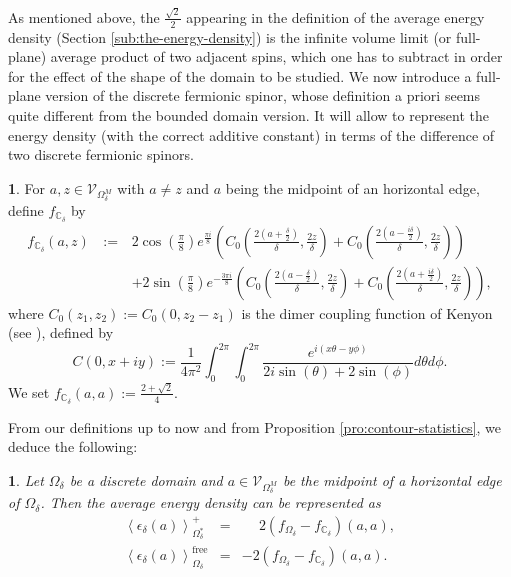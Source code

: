 \documentclass[oneside,english]{amsart}
\numberwithin{equation}{section}
\numberwithin{figure}{section}
\theoremstyle{plain}
\theoremstyle{plain}
\theoremstyle{plain}
\theoremstyle{plain}
\theoremstyle{plain}
\newtheorem{lem}[thm]{\protect\lemmaname}
\theoremstyle{definition}
\newtheorem{defn}[thm]{\protect\definitionname}
\theoremstyle{remark}
\providecommand{\definitionname}{Definition}
\providecommand{\lemmaname}{Lemma}
\begin{document}
As mentioned above, the $\frac{\sqrt{2}}{2}$ appearing in the definition
of the average energy density (Section \ref{sub:the-energy-density})
is the infinite volume limit (or full-plane) average product of two
adjacent spins, which one has to subtract in order for the effect
of the shape of the domain to be studied. We now introduce a full-plane
version of the discrete fermionic spinor, whose definition a priori
seems quite different from the bounded domain version. It will allow
to represent the energy density (with the correct additive constant)
in terms of the difference of two discrete fermionic spinors.
\begin{defn}
\label{def:full-plane-spinor}For $a,z\in\mathcal{V}_{\Omega_{\delta}^{M}}$
with $a\neq z$ and $a$ being the midpoint of an horizontal edge,
define $f_{\mathbb{C}_{\delta}}$ by
\begin{eqnarray*}
f_{\mathbb{C}_{\delta}}\left(a,z\right) & \,:=\, & 2\cos\left(\frac{\pi}{8}\right)e^{\frac{\pi i}{8}}\left(C_{0}\left(\frac{2\left(a+\frac{\delta}{2}\right)}{\delta},\frac{2z}{\delta}\right)+C_{0}\left(\frac{2\left(a-\frac{i\delta}{2}\right)}{\delta},\frac{2z}{\delta}\right)\right)\\
 &  & +2\sin\left(\frac{\pi}{8}\right)e^{-\frac{3\pi i}{8}}\left(C_{0}\left(\frac{2\left(a-\frac{\delta}{2}\right)}{\delta},\frac{2z}{\delta}\right)+C_{0}\left(\frac{2\left(a+\frac{i\delta}{2}\right)}{\delta},\frac{2z}{\delta}\right)\right),
\end{eqnarray*}
where $C_{0}\left(z_{1},z_{2}\right):=C_{0}\left(0,z_{2}-z_{1}\right)$
is the dimer coupling function of Kenyon (see \cite{kenyon-i}), defined
by
\[
C\left(0,x+iy\right):=\frac{1}{4\pi^{2}}\int_{0}^{2\pi}\int_{0}^{2\pi}\frac{e^{i\left(x\theta-y\phi\right)}}{2i\sin\left(\theta\right)+2\sin\left(\phi\right)}d\theta d\phi.
\]
We set $f_{\mathbb{C}_{\delta}}\left(a,a\right):=\frac{2+\sqrt{2}}{4}$. 
\end{defn}
From our definitions up to now and from Proposition \ref{pro:contour-statistics},
we deduce the following:
\begin{lem}
\label{lem:representation-ed-observable}Let $\Omega_{\delta}$ be
a discrete domain and $a\in\mathcal{V}_{\Omega_{\delta}^{M}}$ be
the midpoint of a horizontal edge of $\Omega_{\delta}$. Then the
average energy density can be represented as 
\begin{eqnarray*}
\left\langle \epsilon_{\delta}\left(a\right)\right\rangle _{\Omega_{\delta}^{*}}^{+} & = & \phantom{-}2\left(f_{\Omega_{\delta}}-f_{\mathbb{C}_{\delta}}\right)\left(a,a\right),\\
\left\langle \epsilon_{\delta}\left(a\right)\right\rangle _{\Omega_{\delta}}^{\mathrm{free}} & = & -2\left(f_{\Omega_{\delta}}-f_{\mathbb{C}_{\delta}}\right)\left(a,a\right).
\end{eqnarray*}

\end{lem}
\end{document}
